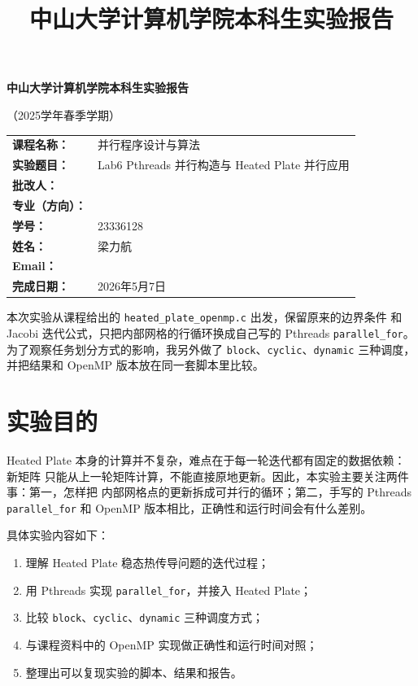 \documentclass[UTF8,a4paper,12pt,fontset=none]{ctexart}
\title{\bfseries 中山大学计算机学院本科生实验报告}
\author{}
\date{}
\begin{document}
\begin{titlepage}
  \centering
  {\bfseries 中山大学计算机学院本科生实验报告\par}
  \vspace{0.5em}
  {（2025学年春季学期）\par}
  \vspace{2em}

  \begin{tabularx}{0.9\textwidth}{>{\bfseries}p{4cm}X}
    课程名称： & 并行程序设计与算法 \\
    实验题目： & Lab6 Pthreads 并行构造与 Heated Plate 并行应用 \\
    批改人： & \\
    专业（方向）： & \\
    学号： & 23336128 \\
    姓名： & 梁力航 \\
    Email： & \\
    完成日期： & 2026年5月7日 \\
  \end{tabularx}

  \vfill
  \begin{minipage}{0.88\textwidth}
    \small
    本次实验从课程给出的 \texttt{heated\_plate\_openmp.c} 出发，保留原来的边界条件
    和 Jacobi 迭代公式，只把内部网格的行循环换成自己写的 Pthreads
    \texttt{parallel\_for}。为了观察任务划分方式的影响，我另外做了
    \texttt{block}、\texttt{cyclic}、\texttt{dynamic} 三种调度，并把结果和 OpenMP
    版本放在同一套脚本里比较。
  \end{minipage}
\end{titlepage}

\section{实验目的}

Heated Plate 本身的计算并不复杂，难点在于每一轮迭代都有固定的数据依赖：新矩阵
只能从上一轮矩阵计算，不能直接原地更新。因此，本实验主要关注两件事：第一，怎样把
内部网格点的更新拆成可并行的循环；第二，手写的 Pthreads \texttt{parallel\_for}
和 OpenMP 版本相比，正确性和运行时间会有什么差别。

具体实验内容如下：
\begin{enumerate}[leftmargin=2.2em]
  \item 理解 Heated Plate 稳态热传导问题的迭代过程；
  \item 用 Pthreads 实现 \texttt{parallel\_for}，并接入 Heated Plate；
  \item 比较 \texttt{block}、\texttt{cyclic}、\texttt{dynamic} 三种调度方式；
  \item 与课程资料中的 OpenMP 实现做正确性和运行时间对照；
  \item 整理出可以复现实验的脚本、结果和报告。
\end{enumerate}
\end{document}
